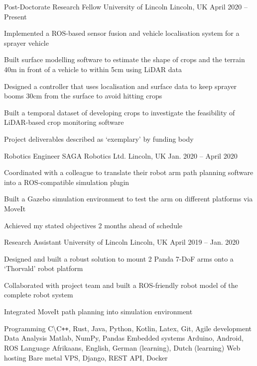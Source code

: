 \documentclass[11pt,a4paper]{awesome-cv}        %
\begin{document}
\begin{cventries}
  \cventry
  {Post-Doctorate Research Fellow}
  {University of Lincoln}
  {Lincoln, UK}
  {April 2020 -- Present}
  {
    \begin{cvitems}
      \item Implemented a ROS-based sensor fusion and vehicle localisation system for a sprayer vehicle
      \item Built surface modelling software to estimate the shape of crops and the terrain 40m in front of a vehicle to within 5cm using LiDAR data 
      \item Designed a controller that uses localisation and surface data to keep sprayer booms 30cm from the surface to avoid hitting crops
      \item Built a temporal dataset of developing crops to investigate the feasibility of LiDAR-based crop monitoring software
      \item Project deliverables described as `exemplary' by funding body
    \end{cvitems}
  }
  \cventry
  {Robotics Engineer}
  {SAGA Robotics Ltd.}
  {Lincoln, UK}
  {Jan. 2020 -- April 2020}
  {
    \begin{cvitems}
      \item Coordinated with a colleague to translate their robot arm path planning software into a ROS-compatible simulation plugin 
      \item Built a Gazebo simulation environment to test the arm on different platforms via MoveIt
      \item Achieved my stated objectives 2 months ahead of schedule
    \end{cvitems}
  }
  \cventry
  {Research Assistant}
  {University of Lincoln}
  {Lincoln, UK}
  {April 2019 -- Jan. 2020}
  {
    \begin{cvitems}
      \item Designed and built a robust solution to mount 2 Panda 7-DoF arms onto a `Thorvald' robot platform
      \item Collaborated with project team and built a ROS-friendly robot model of the complete robot system 
      \item Integrated MoveIt path planning into simulation environment
    \end{cvitems}
  }
\end{cventries}


\begin{cvskills}
  \cvskill
  {Programming}%
  {C\textbackslash C\texttt{++}, Rust, Java, Python, Kotlin, Latex, Git, Agile development}%
  \cvskill
  {Data Analysis}%
  {Matlab, NumPy, Pandas}%
  \cvskill
  {Embedded systems}
  {Arduino, Android, ROS}
  \cvskill
  {Language}
  {Afrikaans, English, German (learning), Dutch (learning)}
  \cvskill
  {Web hosting}
  {Bare metal VPS, Django, REST API, Docker}
\end{cvskills}
\end{document}
